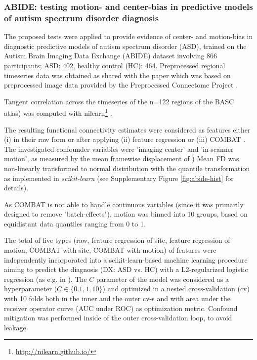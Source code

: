 \documentclass{article}
\begin{document}
\subsubsection*{ABIDE: testing motion- and center-bias in predictive models of autism spectrum disorder diagnosis}

The proposed tests were applied to provide evidence of center- and  motion-bias in diagnostic predictive models of autism spectrum disorder (ASD), trained on the Autism Brain Imaging Data Exchange (ABIDE) dataset \citep{di2014autism} involving 866 participants; ASD: 402, healthy control (HC): 464. Preprocessed regional timeseries data was obtained as shared with the paper \citep{dadi2019benchmarking} which was based on preprocessed image data provided by the Preprocessed Connectome Project \citep{craddock2013neuro}.

Tangent correlation across the timeseries of the n=122 regions of the BASC \citep{bellec2010multi} atlas) was computed with nilearn\footnote{\href{http://nilearn.github.io/}{http://nilearn.github.io/}} \citep{huntenburg2017loading, esteve2015big}. 

The resulting functional connectivity estimates were considered as features either (i) in their raw form or after applying (ii) feature regression \citep{rao2017predictive} or (iii) COMBAT \citep{johnson2007adjusting, fortin2018harmonization}.
The investigated confounder variables were 'imaging center' and 'in-scanner motion', as measured by the mean framewise displacement of \cite{power2014methods})
Mean FD was non-linearly transformed to normal distribution with the quantile transformation \citep{beasley2009rank} as implemented in \emph{scikit-learn} \citep{pedregosa2011scikit} (see Supplementary Figure \ref{fig:abide-hist} for details).

As COMBAT is not able to handle continuous variables (since it was primarily designed to remove "batch-effects"), motion was binned into 10 groups, based on equidistant data quantiles ranging from 0 to 1.

The total of five types (raw, feature regression of site, feature regression of motion, COMBAT with site, COMBAT with motion) of features were independently incorporated into a scikit-learn-based \citep{pedregosa2011scikit} machine learning procedure aiming to predict the diagnosis (DX: ASD vs. HC) with a L2-regularized logistic regression (as e.g. in \citep{dadi2019benchmarking}). The $C$ parameter of the model was considered as a hyperparameter ($C \in \{0.1, 1, 10\}$) and optimized in a nested cross-validation (cv) with 10 folds both in the inner and the outer cv-s and with area under the receiver operator curve (AUC under ROC) as optimization metric. Confound mitigation was performed inside of the outer cross-validation loop, to avoid leakage.
\end{document}
